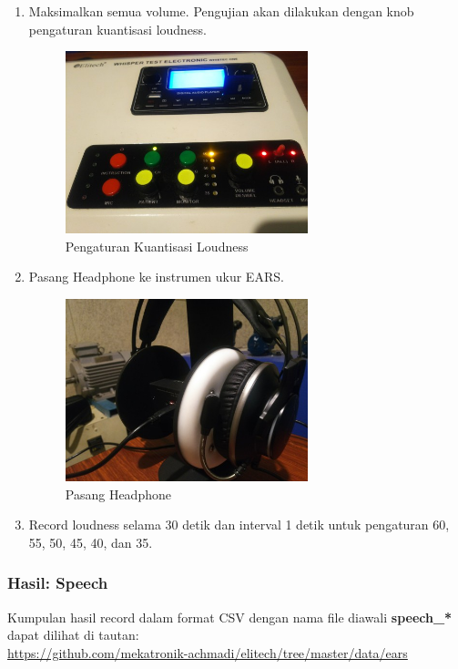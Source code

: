 \documentclass[12pt,]{article}
\begin{document}
\begin{enumerate}
		\newpage
		\item Maksimalkan semua volume. Pengujian akan dilakukan dengan knob pengaturan kuantisasi loudness.
	
		\begin{figure}[!ht]
			\centering
			\includegraphics[width=200pt]{images/loudset}
			\caption{Pengaturan Kuantisasi Loudness}
		\end{figure}
	
		\item Pasang Headphone ke instrumen ukur EARS.
		
		\begin{figure}[!ht]
			\centering
			\includegraphics[width=200pt]{images/headphone}
			\caption{Pasang Headphone}
		\end{figure}
	
		\item Record loudness selama 30 detik dan interval 1 detik untuk pengaturan 60, 55, 50, 45, 40, dan 35.
	\end{enumerate}
	
	\subsubsection{Hasil: Speech}
	
	Kumpulan hasil record dalam format CSV dengan nama file diawali \textbf{speech\_*} dapat dilihat di tautan:\\
	\url{https://github.com/mekatronik-achmadi/elitech/tree/master/data/ears}
	
\end{document}
